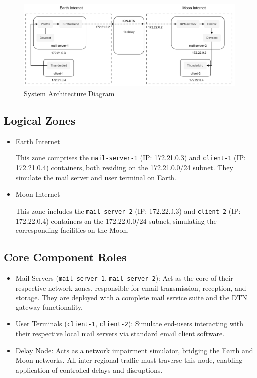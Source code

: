 \begin{figure}[h]
    \centering
    \includegraphics[width=1.0\textwidth]{Experimental Methods/Simulation_Johnson.png}
    \caption{System Architecture Diagram}
    \label{fig:system-architecture}
\end{figure}

\subsection*{Logical Zones}
\begin{itemize}
    \item Earth Internet
    
    This zone comprises the \texttt{mail-server-1} (IP: 172.21.0.3) and \texttt{client-1} (IP: 172.21.0.4) containers, both residing on the 172.21.0.0/24 subnet. They simulate the mail server and user terminal on Earth.
    \item Moon Internet
    
    This zone includes the \texttt{mail-server-2} (IP: 172.22.0.3) and \texttt{client-2} (IP: 172.22.0.4) containers on the 172.22.0.0/24 subnet, simulating the corresponding facilities on the Moon.
\end{itemize}

\subsection*{Core Component Roles}
\begin{itemize}
    \item Mail Servers (\texttt{mail-server-1}, \texttt{mail-server-2}): Act as the core of their respective network zones, responsible for email transmission, reception, and storage. They are deployed with a complete mail service suite and the DTN gateway functionality.
    \item User Terminals (\texttt{client-1}, \texttt{client-2}): Simulate end-users interacting with their respective local mail servers via standard email client software.
    \item Delay Node: Acts as a network impairment simulator, bridging the Earth and Moon networks. All inter-regional traffic must traverse this node, enabling application of controlled delays and disruptions.
\end{itemize}

